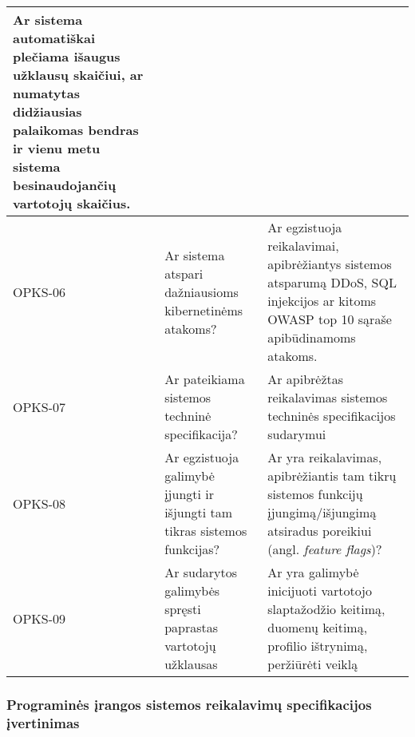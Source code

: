 \documentclass{VUMIFPSkursinis}
\begin{document}
\begin{center}
\begin{longtable}{|C{2cm}|L{5cm}|L{8cm}|}
		Ar sistema automatiškai plečiama išaugus užklausų skaičiui, ar numatytas didžiausias palaikomas bendras ir vienu metu sistema besinaudojančių vartotojų skaičius.                             \\ \hline
		OPKS-06                                                                                                 &
		Ar sistema atspari dažniausioms kibernetinėms atakoms?                                                  &
		Ar egzistuoja reikalavimai, apibrėžiantys sistemos atsparumą DDoS, SQL injekcijos ar kitoms OWASP top 10 sąraše apibūdinamoms atakoms.                                                        \\ \hline
		OPKS-07                                                                                                 &
		Ar pateikiama sistemos techninė specifikacija?                                                          &
		Ar apibrėžtas reikalavimas sistemos techninės specifikacijos sudarymui                                                                                                                        \\ \hline
		OPKS-08                                                                                                 &
		Ar egzistuoja galimybė įjungti ir išjungti tam tikras sistemos funkcijas?                               &
		Ar yra reikalavimas, apibrėžiantis tam tikrų sistemos funkcijų įjungimą/išjungimą atsiradus poreikiui (angl. \textit{feature flags})?                                                         \\ \hline
		OPKS-09                                                                                                 &
		Ar sudarytos galimybės spręsti paprastas vartotojų užklausas                                            &
		Ar yra galimybė inicijuoti vartotojo slaptažodžio keitimą, duomenų keitimą, profilio ištrynimą, peržiūrėti veiklą                                                                             \\ \hline
	\end{longtable}
\end{center}

\subsubsection{Programinės įrangos sistemos reikalavimų specifikacijos įvertinimas}
\end{document}
